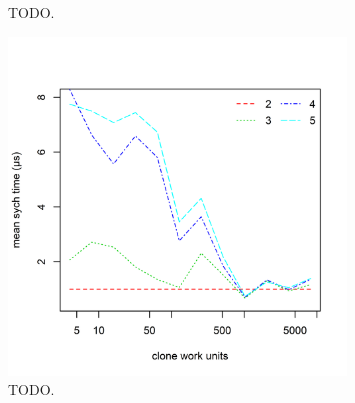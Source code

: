 \begin{figure}
{\begin{subfigure}[b]{0.63\textwidth}
		\caption{}
		\label{fig:clone_compete_1}
	\end{subfigure}%
}
\caption[TODO]{TODO.}
\label{fig:clone_compete}
\end{figure}

\begin{figure}
	\centering
	\includegraphics[width=0.8\textwidth]{experiments/clone_compete_2.png}
	\caption[TODO]{TODO.}
	\label{fig:clone_compete_3}
\end{figure}


